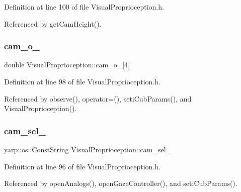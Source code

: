 Definition at line 100 of file Visual\+Proprioception.\+h.



Referenced by get\+Cam\+Height().

\mbox{\label{classVisualProprioception_ae3278b7356ddf3fe357cc74129988521}} 
\subsubsection{\texorpdfstring{cam\+\_\+o\+\_\+}{cam\_o\_}}
{\footnotesize\ttfamily double Visual\+Proprioception\+::cam\+\_\+o\+\_\+\mbox{[}4\mbox{]}\hspace{0.3cm}{\ttfamily [protected]}}



Definition at line 98 of file Visual\+Proprioception.\+h.



Referenced by observe(), operator=(), seti\+Cub\+Params(), and Visual\+Proprioception().

\mbox{\label{classVisualProprioception_af0e11e8cc5facba0c725fac0b51be679}} 
\subsubsection{\texorpdfstring{cam\+\_\+sel\+\_\+}{cam\_sel\_}}
{\footnotesize\ttfamily yarp\+::os\+::\+Const\+String Visual\+Proprioception\+::cam\+\_\+sel\+\_\+\hspace{0.3cm}{\ttfamily [protected]}}



Definition at line 96 of file Visual\+Proprioception.\+h.



Referenced by open\+Analogs(), open\+Gaze\+Controller(), and seti\+Cub\+Params().

\mbox{\label{classVisualProprioception_aa432bf481b6dd29f2701b095f68b1e19}} 

